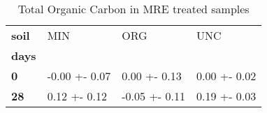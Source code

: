 \begin{table}
\centering
\caption{Total Organic Carbon in MRE treated samples}
\label{<built-in method lower of str object at 0x7f271a5c6ae8>_treated_main}
\begin{tabular}{llll}
\toprule
\textbf{soil} &            MIN &            ORG &           UNC \\
\textbf{days} &                &                &               \\
\midrule
\textbf{0   } &  -0.00 +- 0.07 &   0.00 +- 0.13 &  0.00 +- 0.02 \\
\textbf{28  } &   0.12 +- 0.12 &  -0.05 +- 0.11 &  0.19 +- 0.03 \\
\bottomrule
\end{tabular}
\end{table}
